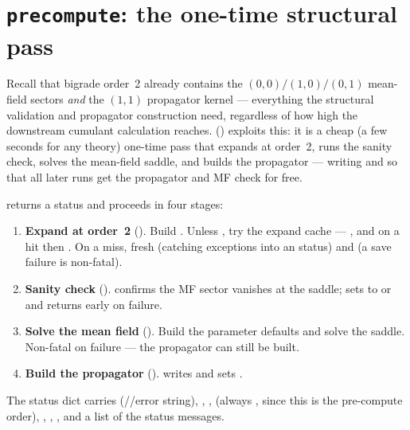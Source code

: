 \section{\texttt{precompute}: the one-time structural pass}
\label{sec:precompute}

Recall that bigrade order~2 already contains the $(0,0)/(1,0)/(0,1)$ mean-field
sectors \emph{and} the $(1,1)$ propagator kernel --- everything the structural
validation and propagator construction need, regardless of how high the
downstream cumulant calculation reaches. 
() exploits this: it is a cheap (a few
seconds for any theory) one-time pass that expands at order~2, runs the sanity
check, solves the mean-field saddle, and builds the propagator --- writing
 and  so that all later runs
get the propagator and MF check for free.

 returns a status
 and proceeds in four stages:

\begin{enumerate}
  \item \textbf{Expand at order~2} (). Build
        . Unless ,
        try the expand cache --- , and
        on a hit  then . On a miss,
         fresh (catching exceptions into an
         status) and  (a save failure
        is non-fatal).
  \item \textbf{Sanity check} ().
         confirms the MF sector vanishes at the saddle;
        sets  to  or  and returns
        early on failure.
  \item \textbf{Solve the mean field} (). Build
        the parameter defaults and solve the saddle. Non-fatal on failure --- the
        propagator can still be built.
  \item \textbf{Build the propagator} ().
         writes
         and sets .
\end{enumerate}

The status dict carries  (//error
string), , ,  (always
, since this is the pre-compute order), ,
, , and a  list of the
status messages.

